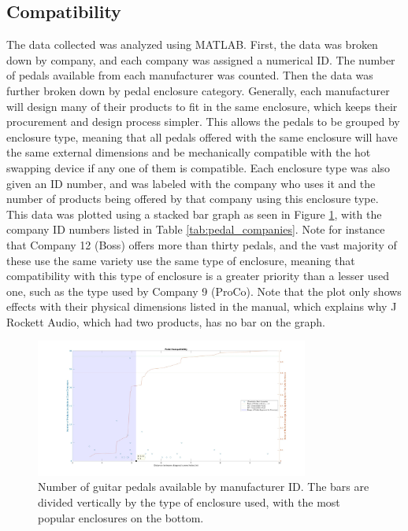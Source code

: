 \documentclass{article}
\begin{document}
	\subsection{Compatibility}
	The data collected was analyzed using MATLAB.  First, the data was broken down by company, and each company was assigned a numerical ID.  The number of pedals available from each manufacturer was counted.  Then the data was further broken down by pedal enclosure category.  Generally, each manufacturer will design many of their products to fit in the same enclosure, which keeps their procurement and design process simpler.  This allows the pedals to be grouped by enclosure type, meaning that all pedals offered with the same enclosure will have the same external dimensions and be mechanically compatible with the hot swapping device if any one of them is compatible.  Each enclosure type was also given an ID number, and was labeled with the company who uses it and the number of products being offered by that company using this enclosure type.  This data was plotted using a stacked bar graph as seen in Figure \ref{fig:pedalsAvailable}, with the company ID numbers listed in Table \ref{tab:pedal_companies}.  Note for instance that Company 12 (Boss) offers more than thirty pedals, and the vast majority of these use the same variety use the same type of enclosure, meaning that compatibility with this type of enclosure is a greater priority than a lesser used one, such as the type used by Company 9 (ProCo).  Note that the plot only shows effects with their physical dimensions listed in the manual, which explains why J Rockett Audio, which had two products, has no bar on the graph.

	\begin{figure}
		\centering
		\includegraphics[width = 0.8\textwidth]{PR4Images/PedalsAvailable.jpg}
		\caption{Number of guitar pedals available by manufacturer ID.  The bars are divided vertically by the type of enclosure used, with the most popular enclosures on the bottom.}
		\label{fig:pedalsAvailable}
	\end{figure}
\end{document}
